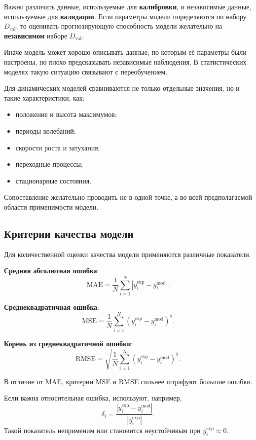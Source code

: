 Важно различать данные, используемые для \textbf{калибровки}, и независимые данные, используемые для \textbf{валидации}. Если параметры модели определяются по набору $D_{\mathrm{cal}}$, то оценивать прогнозирующую способность модели желательно на \textbf{независимом} наборе $D_{\mathrm{val}}$.

Иначе модель может хорошо описывать данные, по которым её параметры были настроены, но плохо предсказывать независимые наблюдения. В статистических моделях такую ситуацию связывают с переобучением.

Для динамических моделей сравниваются не только отдельные значения, но и такие характеристики, как:
\begin{itemize}
	\item положение и высота максимумов;
	\item периоды колебаний;
	\item скорости роста и затухания;
	\item переходные процессы;
	\item стационарные состояния.
\end{itemize}

Сопоставление желательно проводить не в одной точке, а во всей предполагаемой области применимости модели.

\subsection{Критерии качества модели}

Для количественной оценки качества модели применяются различные показатели.

\textbf{Средняя абсолютная ошибка}:
\[
\mathrm{MAE}
=
\frac{1}{N}
\sum_{i=1}^{N}
\left|
y_i^{\mathrm{exp}}-y_i^{\mathrm{mod}}
\right|.
\]

\textbf{Среднеквадратичная ошибка}:
\[
\mathrm{MSE}
=
\frac{1}{N}
\sum_{i=1}^{N}
\left(
y_i^{\mathrm{exp}}-y_i^{\mathrm{mod}}
\right)^2.
\]

\textbf{Корень из среднеквадратичной ошибки}:
\[
\mathrm{RMSE}
=
\sqrt{
	\frac{1}{N}
	\sum_{i=1}^{N}
	\left(
	y_i^{\mathrm{exp}}-y_i^{\mathrm{mod}}
	\right)^2
}.
\]

В отличие от MAE, критерии MSE и RMSE сильнее штрафуют большие ошибки.

Если важна относительная ошибка, используют, например,
\[
\delta_i
=
\frac{
	|y_i^{\mathrm{exp}}-y_i^{\mathrm{mod}}|
}{
	|y_i^{\mathrm{exp}}|
}.
\]
Такой показатель неприменим или становится неустойчивым при $y_i^{\mathrm{exp}}\approx 0$.

